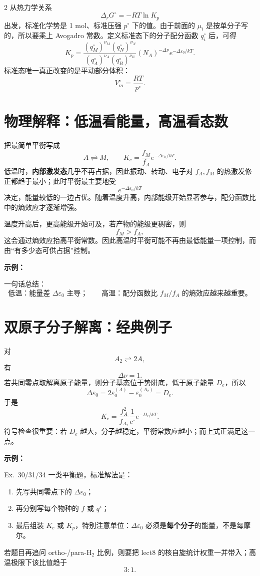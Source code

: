\documentclass[a4paper,9pt]{article}
\newenvironment{examplebox}
{\par\vspace{0.3em}\noindent\begin{tcolorbox}[colback=boxbg,colframe=derivcolor,boxrule=0.5pt,arc=2pt,left=2pt,right=2pt,top=2pt,bottom=2pt,boxsep=0pt]\scriptsize\noindent\textcolor{derivcolor}{\textbf{示例：}}\par\setlength{\parskip}{0.1ex}\setlength{\itemsep}{0pt}\setlength{\parsep}{0pt}}
{\end{tcolorbox}\par\vspace{0.3em}}
\begin{document}
\begin{multicols}{2}
	从热力学关系
	\[
		\Delta_rG^\circ=-RT\ln K_p
	\]
	出发，标准化学势是 1 mol、标准压强 $p^\circ$ 下的值。由于前面的 $\mu_i$ 是按单分子写的，所以要乘上 Avogadro 常数。定义标准态下的分子配分函数 $q_i^\circ$ 后，可得
	\[
		K_p=\frac{(q_M^\circ)^{\nu_M}(q_N^\circ)^{\nu_N}}{(q_A^\circ)^{\nu_A}(q_B^\circ)^{\nu_B}}(N_A)^{-\Delta\nu}e^{-\Delta\varepsilon_0/kT}.
	\]
	标准态唯一真正改变的是平动部分体积：
	\[
		V_m^\circ=\frac{RT}{p^\circ}.
	\]

	\section{物理解释：低温看能量，高温看态数}

	把最简单平衡写成
	\[
		A\rightleftharpoons M,
		\qquad
		K_c=\frac{f_M}{f_A}e^{-\Delta\varepsilon_0/kT}.
	\]
	低温时，\textbf{内部激发态}几乎不再占据，因此振动、转动、电子对 $f_A,f_M$ 的热激发修正都趋于最小；此时平衡最主要地受
	\[
		e^{-\Delta\varepsilon_0/kT}
	\]
	决定，能量较低的一边占优。随着温度升高，内部能级开始显著参与，配分函数比中的熵效应才逐渐增强。

	温度升高后，更高能级开始可及，若产物的能级更稠密，则
	\[
		f_M>f_A,
	\]
	这会通过熵效应抬高平衡常数。因此高温时平衡可能不再由最低能量一项控制，而由“有多少态可供占据”控制。

	\begin{examplebox}
		一句话总结：
		\[
			\text{低温：能量差 }\Delta\varepsilon_0\text{ 主导；}
			\qquad
			\text{高温：配分函数比 }f_M/f_A\text{ 的熵效应越来越重要。}
		\]
	\end{examplebox}

	\section{双原子分子解离：经典例子}

	对
	\[
		A_2\rightleftharpoons 2A,
	\]
	有
	\[
		\Delta\nu=1.
	\]
	若共同零点取解离原子能量，则分子基态位于势阱底，低于原子能量 $D_e$，所以
	\[
		\Delta\varepsilon_0=2\varepsilon_0^{(A)}-\varepsilon_0^{(A_2)}=D_e.
	\]
	于是
	\[
		K_c=\frac{f_A^2}{f_{A_2}}\frac1{c^\circ}e^{-D_e/kT}.
	\]
	符号检查很重要：若 $D_e$ 越大，分子越稳定，平衡常数应越小；而上式正满足这一点。

	\begin{examplebox}
		Ex.~30/31/34 一类平衡题，标准解法是：
		\begin{enumerate}
			\item 先写共同零点下的 $\Delta\varepsilon_0$；
			\item 再分别写每个物种的 $f$ 或 $q^\circ$；
			\item 最后组装 $K_c$ 或 $K_p$，特别注意单位：$\Delta\varepsilon_0$ 必须是\textbf{每个分子}的能量，不是每摩尔。
		\end{enumerate}
		若题目再追问 ortho-/para-H$_2$ 比例，则要把 lect8 的核自旋统计权重一并带入；高温极限下该比值趋于
		\[
			3:1.
		\]
	\end{examplebox}


\end{multicols}
\end{document}
